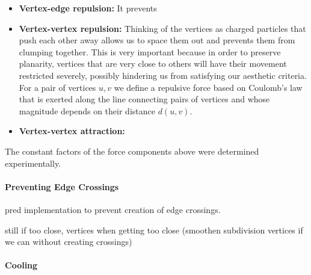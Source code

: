 \begin{itemize}
    \item \textbf{Vertex-edge repulsion:}
    It prevents
    \todo{}

    \item \textbf{Vertex-vertex repulsion:}
    Thinking of the vertices as charged particles that push each other away allows us to space them out and prevents them from clumping together. This is very important because in order to preserve planarity, vertices that are very close to others will have their movement restricted severely, possibly hindering us from satisfying our aesthetic criteria. For a pair of vertices $u, v$ we define a repulsive force based on Coulomb's law that is exerted along the line connecting pairs of vertices and whose magnitude depends on their distance $d(u,v)$.

	\item \textbf{Vertex-vertex attraction:}
	\todo{}
\end{itemize}

The constant factors of the force components above were determined experimentally.

\paragraph{Preventing Edge Crossings}

pred implementation to prevent creation of edge crossings.

still if too close, vertices when getting too close (smoothen subdivision vertices if we can without creating crossings)

\paragraph{Cooling}
